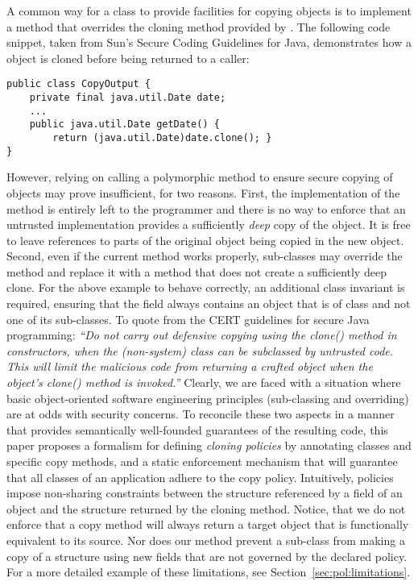 \documentclass{LMCS}
\newcommand{\ttt}[1]{}
\begin{document}
\noindent A common way for a class to provide facilities for copying objects is
to implement a \ttt{clone()} method that overrides the cloning
method provided by \ttt{java.lang.Object}. 
The following code snippet, taken from Sun's Secure Coding
Guidelines for Java, demonstrates how a \ttt{date} object is cloned
before being returned to a caller:
\begin{lstlisting}
public class CopyOutput {
    private final java.util.Date date;
    ...
    public java.util.Date getDate() {
        return (java.util.Date)date.clone(); }
}
\end{lstlisting}

\noindent However, relying on calling a polymorphic \ttt{clone} method
to ensure secure copying of objects may prove insufficient, for two
reasons. First, the implementation of the \ttt{clone()} method is
entirely left to the programmer and there is no way to enforce that an
untrusted implementation provides a sufficiently \emph{deep} copy of
the object. It is free to leave references to parts of the original
object being copied in the new object. Second,
even if the current \ttt{clone()} method works properly, sub-classes may
override the \ttt{clone()} method and replace it with a method that does not
create a sufficiently deep clone.  For the above example to behave correctly,
an additional class invariant is required, ensuring that the \ttt{date} field
always contains an object that is of class \ttt{Date} and not one of its 
sub-classes. To quote from the CERT guidelines for secure Java programming:
\emph{``Do not carry out defensive copying using the clone() method in
constructors, when the (non-system) class can be subclassed by untrusted code.
This will limit the malicious code from returning a crafted object when the
object's clone() method is invoked.''} Clearly, we are faced with a situation
where basic object-oriented software engineering principles (sub-classing and
overriding) are at odds with security concerns.
To reconcile these two aspects in a manner that provides semantically
well-founded guarantees of the resulting code, this paper proposes a formalism
for defining \emph{cloning policies} by annotating classes and specific copy
methods, and a static enforcement mechanism that will guarantee that all
classes of an application adhere to the copy policy. Intuitively,
policies impose non-sharing constraints between the structure 
referenced by a field of an object and the structure returned by the
cloning method.  Notice, that we do not enforce that
a copy method will always return a target object that is functionally
equivalent to its source. Nor does our method prevent a sub-class from
making a copy of a structure using new fields that are not governed by
the declared policy. For a more detailed example of these limitations,
see Section~\ref{sec:pol:limitations}. 
\end{document}
